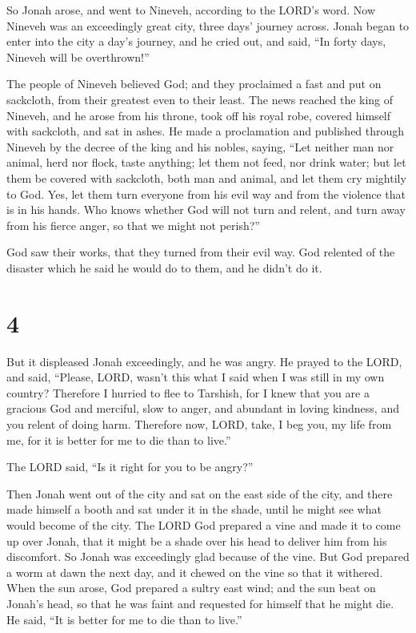  So Jonah arose, and went to Nineveh, according to the
LORD's word. Now Nineveh was an exceedingly great city, three days'
journey across.  Jonah began to enter into the city a day's
journey, and he cried out, and said, ``In forty days, Nineveh will be
overthrown!''

 The people of Nineveh believed God; and they proclaimed a
fast and put on sackcloth, from their greatest even to their least.
 The news reached the king of Nineveh, and he arose from his
throne, took off his royal robe, covered himself with sackcloth, and sat
in ashes.  He made a proclamation and published through
Nineveh by the decree of the king and his nobles, saying, ``Let neither
man nor animal, herd nor flock, taste anything; let them not feed, nor
drink water;  but let them be covered with sackcloth, both
man and animal, and let them cry mightily to God. Yes, let them turn
everyone from his evil way and from the violence that is in his hands.
 Who knows whether God will not turn and relent, and turn
away from his fierce anger, so that we might not perish?''

 God saw their works, that they turned from their evil way.
God relented of the disaster which he said he would do to them, and he
didn't do it.

\hypertarget{section-3}{%
\section{4}\label{section-3}}

 But it displeased Jonah exceedingly, and he was angry.
 He prayed to the LORD, and said, ``Please, LORD, wasn't
this what I said when I was still in my own country? Therefore I hurried
to flee to Tarshish, for I knew that you are a gracious God and
merciful, slow to anger, and abundant in loving kindness, and you relent
of doing harm.  Therefore now, LORD, take, I beg you, my
life from me, for it is better for me to die than to live.''

 The LORD said, ``Is it right for you to be angry?''

 Then Jonah went out of the city and sat on the east side of
the city, and there made himself a booth and sat under it in the shade,
until he might see what would become of the city.  The LORD
God prepared a vine and made it to come up over Jonah, that it might be
a shade over his head to deliver him from his discomfort. So Jonah was
exceedingly glad because of the vine.  But God prepared a
worm at dawn the next day, and it chewed on the vine so that it
withered.  When the sun arose, God prepared a sultry east
wind; and the sun beat on Jonah's head, so that he was faint and
requested for himself that he might die. He said, ``It is better for me
to die than to live.''

